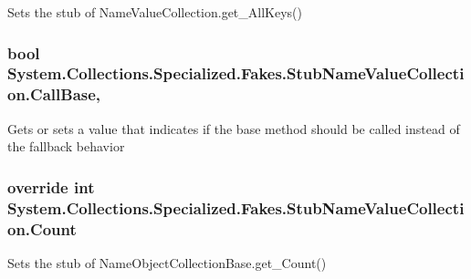 Sets the stub of Name\-Value\-Collection.\-get\-\_\-\-All\-Keys()

\hypertarget{class_system_1_1_collections_1_1_specialized_1_1_fakes_1_1_stub_name_value_collection_a57407cd9bcfeab618416a5f0e9271edf}{
\subsubsection[{Call\-Base}]{\setlength{\rightskip}{0pt plus 5cm}bool System.\-Collections.\-Specialized.\-Fakes.\-Stub\-Name\-Value\-Collection.\-Call\-Base\hspace{0.3cm}{\ttfamily [get]}, {\ttfamily [set]}}}\label{class_system_1_1_collections_1_1_specialized_1_1_fakes_1_1_stub_name_value_collection_a57407cd9bcfeab618416a5f0e9271edf}


Gets or sets a value that indicates if the base method should be called instead of the fallback behavior

\hypertarget{class_system_1_1_collections_1_1_specialized_1_1_fakes_1_1_stub_name_value_collection_a8999671cce76a4a96655e5f347a6f85c}{
\subsubsection[{Count}]{\setlength{\rightskip}{0pt plus 5cm}override int System.\-Collections.\-Specialized.\-Fakes.\-Stub\-Name\-Value\-Collection.\-Count\hspace{0.3cm}{\ttfamily [get]}}}\label{class_system_1_1_collections_1_1_specialized_1_1_fakes_1_1_stub_name_value_collection_a8999671cce76a4a96655e5f347a6f85c}


Sets the stub of Name\-Object\-Collection\-Base.\-get\-\_\-\-Count()

